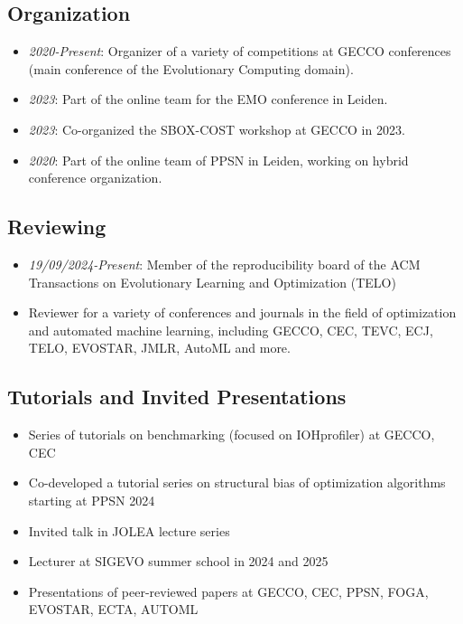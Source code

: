 \subsection*{Organization}
\begin{itemize}
    \item[] \textit{2020-Present}: Organizer of a variety of competitions at GECCO conferences (main conference of the Evolutionary Computing domain).
    \item[] \textit{2023}: Part of the online team for the EMO conference in Leiden. 
    \item[] \textit{2023}: Co-organized the SBOX-COST workshop at GECCO in 2023.
    \item[] \textit{2020}: Part of the online team of PPSN in Leiden, working on hybrid conference organization. 
\end{itemize}

\subsection*{Reviewing}
\begin{itemize}
    \item[] \textit{19/09/2024-Present}: Member of the reproducibility board of the ACM Transactions on Evolutionary Learning and Optimization (TELO)
    \item[] Reviewer for a variety of conferences and journals in the field of optimization and automated machine learning, including GECCO, CEC, TEVC, ECJ, TELO, EVOSTAR, JMLR, AutoML and more.
\end{itemize}

\subsection*{Tutorials and Invited Presentations}
\begin{itemize}
    \item[] Series of tutorials on benchmarking (focused on IOHprofiler) at GECCO, CEC
    \item[] Co-developed a tutorial series on structural bias of optimization algorithms starting at PPSN 2024
    \item[] Invited talk in JOLEA lecture series
    \item[] Lecturer at SIGEVO summer school in 2024 and 2025
    \item[] Presentations of peer-reviewed papers at GECCO, CEC, PPSN, FOGA, EVOSTAR, ECTA, AUTOML
\end{itemize}

